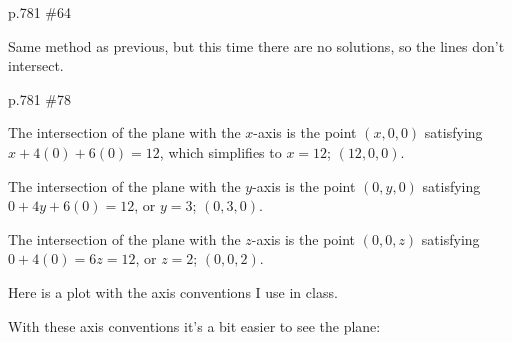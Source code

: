 \begin{practice}p.781 \#64\end{practice}
\begin{pracsol}
  Same method as previous, but this time there are no solutions, so the lines don't intersect.
\end{pracsol}
\begin{practice}p.781 \#78\end{practice}
\begin{pracsol}
  The intersection of the plane with the $x$-axis is the point $(x,0,0)$ satisfying $x+4(0)+6(0)=12$, which simplifies to $x=12$; $(12,0,0)$.

  The intersection of the plane with the $y$-axis is the point $(0,y,0)$ satisfying $0+4y+6(0)=12$, or $y=3$; $(0,3,0)$.

  The intersection of the plane with the $z$-axis is the point $(0,0,z)$ satisfying $0+4(0)=6z=12$, or $z=2$; $(0,0,2)$.

  Here is a plot with the axis conventions I use in class.
  \begin{center}
  \end{center}
  With these axis conventions it's a bit easier to see the plane:
  \begin{center}
  \end{center}
\end{pracsol}

